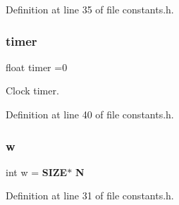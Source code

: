 Definition at line 35 of file constants.\+h.

\mbox{\label{constants_8h_abb8bd4fceff21f1beaf39e2aba94840a}} 
\subsubsection{timer}
{\footnotesize\ttfamily float timer =0}



Clock timer. 



Definition at line 40 of file constants.\+h.

\mbox{\label{constants_8h_aac374e320caaadeca4874add33b62af2}} 
\subsubsection{w}
{\footnotesize\ttfamily int w = \textbf{ S\+I\+ZE}$\ast$\textbf{ N}}



Definition at line 31 of file constants.\+h.

